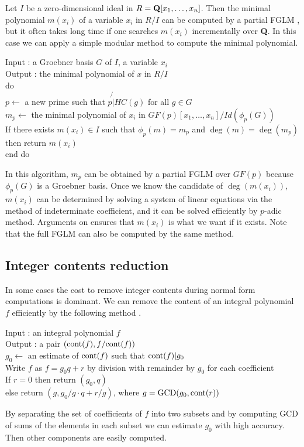 \documentclass[runningheads]{cl2emult}
\def\cont{{\rm cont}}
\def\GCD{{\rm GCD}}
\begin{document}
Let $I$ be a zero-dimensional ideal in $R={\bf Q}[x_1,\ldots,x_n]$.
Then the minimal polynomial $m(x_i)$ of a variable $x_i$ in $R/I$ can
be computed by a partial FGLM \cite{FGLM}, but it often takes long
time if one searches $m(x_i)$ incrementally over {\bf Q}.  In this
case we can apply a simple modular method to compute the minimal
polynomial.
\begin{tabbing}
Input : a Groebner basis $G$ of $I$, a variable $x_i$\\
Output : the minimal polynomial of $x$ in $R/I$\\
do \= \\
\> $p \leftarrow$ a new prime such that $p \not{|} HC(g)$ for all $g \in G$\\
\> $m_p \leftarrow$ the minimal polynomial of $x_i$ in $GF(p)[x_1,\ldots,x_n]/Id(\phi_p(G))$\\
\> If there exists $m(x_i) \in I$ such that $\phi_p(m) = m_p$ and $\deg(m)=\deg(m_p)$\\
\> then return $m(x_i)$\\
end do
\end{tabbing}
In this algorithm, $m_p$ can be obtained by a partial FGLM over
$GF(p)$ because $\phi_p(G)$ is a Groebner basis. Once we know the
candidate of $\deg(m(x_i))$, $m(x_i)$ can be determined by solving a
system of linear equations via the method of indeterminate
coefficient, and it can be solved efficiently by $p$-adic method.
Arguments on \cite{NOYO} ensures that $m(x_i)$ is what we want if it
exists. Note that the full FGLM can also be computed by the same
method.

\subsection{Integer contents reduction}
\label{gbcont}

In some cases the cost to remove integer contents during normal form
computations is dominant. We can remove the content of an integral
polynomial $f$ efficiently by the following method \cite{REPL}.
\begin{tabbing}
Input : an integral polynomial $f$\\
Output : a pair $(\cont(f),f/\cont(f))$\\
$g_0 \leftarrow$ an estimate of $\cont(f)$ such that $\cont(f)|g_0$\\
Write $f$ as $f = g_0q+r$ by division with remainder by $g_0$ for each coefficient\\
If $r = 0$ then return $(g_0,q)$\\
else return $(g,g_0/g \cdot q + r/g)$, where $g = \GCD(g_0,\cont(r))$
\end{tabbing}
By separating the set of coefficients of $f$ into two subsets and by
computing GCD of sums of the elements in each subset we can estimate
$g_0$ with high accuracy. Then other components are easily computed.
\end{document}
